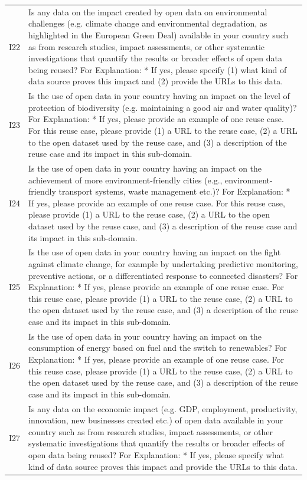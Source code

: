 {\begin{longtable}[]{@{}
  L{0.1386}
  L{0.8614}@{}}
I22 & Is any data on the impact created by open data on environmental challenges (e.g. climate change and environmental degradation, as highlighted in the European Green Deal) available in your country such as from research studies, impact assessments, or other systematic investigations that quantify the results or broader effects of open data being reused? For Explanation: * If yes, please specify (1) what kind of data source proves this impact and (2) provide the URLs to this data. \\
I23 & Is the use of open data in your country having an impact on the level of protection of biodiversity (e.g. maintaining a good air and water quality)? For Explanation: * If yes, please provide an example of one reuse case. For this reuse case, please provide (1) a URL to the reuse case, (2) a URL to the open dataset used by the reuse case, and (3) a description of the reuse case and its impact in this sub-domain. \\
I24 & Is the use of open data in your country having an impact on the achievement of more environment-friendly cities (e.g., environment-friendly transport systems, waste management etc.)? For Explanation: * If yes, please provide an example of one reuse case. For this reuse case, please provide (1) a URL to the reuse case, (2) a URL to the open dataset used by the reuse case, and (3) a description of the reuse case and its impact in this sub-domain. \\
I25 & Is the use of open data in your country having an impact on the fight against climate change, for example by undertaking predictive monitoring, preventive actions, or a differentiated response to connected disasters? For Explanation: * If yes, please provide an example of one reuse case. For this reuse case, please provide (1) a URL to the reuse case, (2) a URL to the open dataset used by the reuse case, and (3) a description of the reuse case and its impact in this sub-domain. \\
I26 & Is the use of open data in your country having an impact on the consumption of energy based on fuel and the switch to renewables? For Explanation: * If yes, please provide an example of one reuse case. For this reuse case, please provide (1) a URL to the reuse case, (2) a URL to the open dataset used by the reuse case, and (3) a description of the reuse case and its impact in this sub-domain. \\
I27 & Is any data on the economic impact (e.g. GDP, employment, productivity, innovation, new businesses created etc.) of open data available in your country such as from research studies, impact assessments, or other systematic investigations that quantify the results or broader effects of open data being reused? For Explanation: * If yes, please specify what kind of data source proves this impact and provide the URLs to this data. \\

\end{longtable}}
